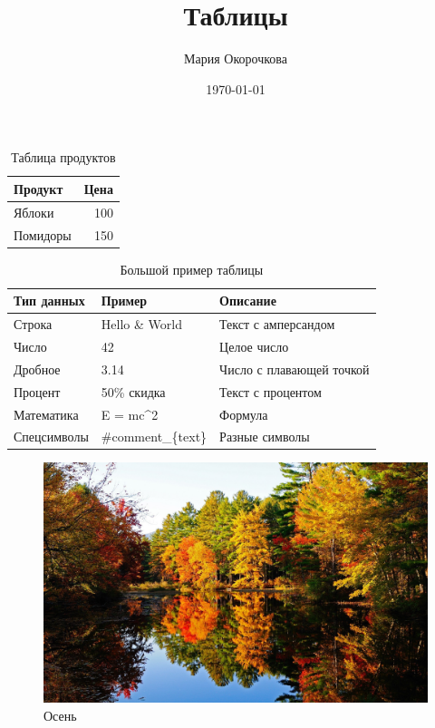 \documentclass{article}
\title{Таблицы}
\author{Мария Окорочкова}
\date{\today}
\begin{document}
\maketitle

\begin{table}[htbp]
\centering
\begin{tabular}{l r}
\hline
Продукт & Цена \\
\hline
Яблоки & 100 \\
Помидоры & 150 \\
\hline
\end{tabular}
\caption{Таблица продуктов}
\label{tab:products}
\end{table}

\begin{table}[htbp]
\centering
\begin{tabular}{l l p{6cm}}
\hline
Тип данных & Пример & Описание \\
\hline
Строка & Hello \& World & Текст с амперсандом \\
Число & 42 & Целое число \\
Дробное & 3.14 & Число с плавающей точкой \\
Процент & 50\% скидка & Текст с процентом \\
Математика & E = mc\textasciicircum{}2 & Формула \\
Спецсимволы & \#comment\_\{text\} & Разные символы \\
\hline
\end{tabular}
\caption{Большой пример таблицы}
\label{tab:complex_data}
\end{table}

\begin{figure}[htbp]
\centering
\includegraphics[width=1.0\textwidth]{image.jpg}
\caption{Осень}
\label{fig:example}
\end{figure}
\end{document}
